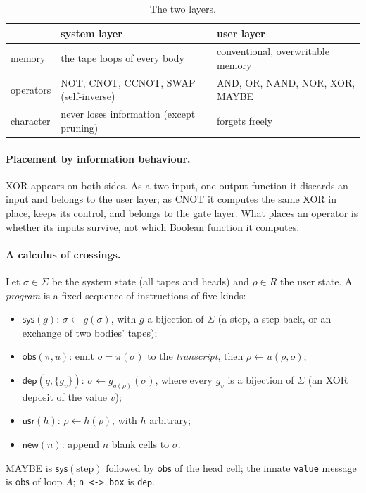 \documentclass[11pt]{article}
\theoremstyle{definition}
\theoremstyle{remark}
\newcommand{\code}[1]{\texttt{#1}}
\begin{document}
\begin{table}[t]
\centering
\small
\begin{tabular}{@{}l l l@{}}
\toprule
 & system layer & user layer \\
\midrule
memory & the tape loops of every body & conventional, overwritable memory \\
operators & NOT, CNOT, CCNOT, SWAP (self-inverse) & AND, OR, NAND, NOR, XOR, MAYBE \\
character & never loses information (except pruning) & forgets freely \\
\bottomrule
\end{tabular}
\caption{The two layers.}
\label{tab:layers}
\end{table}

\paragraph{Placement by information behaviour.}
XOR appears on both sides. As a two-input, one-output function it
discards an input and belongs to the user layer; as CNOT it computes the
same XOR in place, keeps its control, and belongs to the gate layer. What
places an operator is whether its inputs survive, not which Boolean
function it computes.

\paragraph{A calculus of crossings.}
Let $\sigma\in\Sigma$ be the system state (all tapes and heads) and
$\rho\in R$ the user state. A \emph{program} is a fixed sequence of
instructions of five kinds:
\begin{itemize}[nosep]
\item $\mathsf{sys}(g)$: $\sigma\gets g(\sigma)$, with $g$ a bijection of
  $\Sigma$ (a step, a step-back, or an exchange of two bodies' tapes);
\item $\mathsf{obs}(\pi,u)$: emit $o=\pi(\sigma)$ to the
  \emph{transcript}, then $\rho\gets u(\rho,o)$;
\item $\mathsf{dep}(q,\{g_v\})$: $\sigma\gets g_{q(\rho)}(\sigma)$, where
  every $g_v$ is a bijection of $\Sigma$ (an XOR deposit of the value
  $v$);
\item $\mathsf{usr}(h)$: $\rho\gets h(\rho)$, with $h$ arbitrary;
\item $\mathsf{new}(n)$: append $n$ blank cells to $\sigma$.
\end{itemize}
MAYBE is $\mathsf{sys}(\text{step})$ followed by $\mathsf{obs}$ of the
head cell; the innate \code{value} message is $\mathsf{obs}$ of loop $A$;
\code{n <-> box} is $\mathsf{dep}$.
\end{document}
